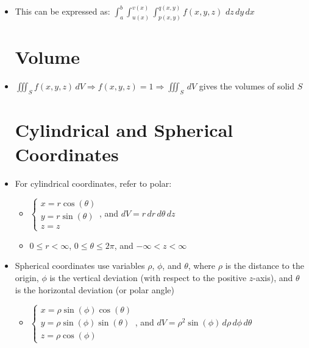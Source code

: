 \begin{itemize}
    \item This can be expressed as: $\displaystyle \int_a^b\int_{u(x)}^{v(x)}\int_{p(x,y)}^{q(x,y)} f(x,y,z)\,\,dz\,dy\,dx$

      \section{Volume}

    \item $\displaystyle \iiint_S f(x,y,z)\, dV\Rightarrow f(x,y,z) = 1 \Rightarrow \iiint_S\,dV$ gives the volumes of solid $S $

      \section{Cylindrical and Spherical Coordinates}

    \item For cylindrical coordinates, refer to polar:

      \begin{itemize}

        \item $\left\{\begin{array}{l} x=r\cos(\theta)\\ y=r\sin(\theta)\\ z=z \end{array}$, and $dV=r\,dr\,d\theta\,dz$

          \item $0\leq r < \infty$, $0\leq\theta\leq2\pi$, and $-\infty< z < \infty$

      \end{itemize}

    \item Spherical coordinates use variables $\rho$, $\phi$, and $\theta$, where $\rho$ is the distance to the origin, $\phi$ is the vertical deviation (with respect to the positive $z$-axis), and $\theta$ is the horizontal deviation (or polar angle)

      \begin{itemize}

        \item $\left\{\begin{array}{l} x = \rho\sin(\phi)\cos(\theta)\\ y = \rho\sin(\phi)\sin(\theta)\\ z = \rho\cos(\phi)  \end{array}$, and $dV=\rho^2\sin(\phi)\,d\rho\,d\phi\,d\theta$


\end{itemize}
\end{itemize}
